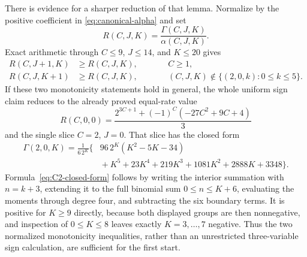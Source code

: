 \documentclass[11pt]{article}
\theoremstyle{remark}
\begin{document}
There is evidence for a sharper reduction of that lemma.  Normalize by the
positive coefficient in \eqref{eq:canonical-alpha} and set
\[
 R(C,J,K)=\frac{\Gamma(C,J,K)}{\alpha(C,J,K)}.
\]
Exact arithmetic through $C\leq9$, $J\leq14$, and $K\leq20$ gives
\begin{align*}
 R(C,J+1,K)&\geq R(C,J,K),\qquad &&C\geq1,\\
 R(C,J,K+1)&\geq R(C,J,K),
 &&(C,J,K)\notin\{(2,0,k):0\leq k\leq5\}.
\end{align*}
If these two monotonicity statements hold in general, the whole uniform sign
claim reduces to the already proved equal-rate value
\[
 R(C,0,0)=
 \frac{2^{3C+1}+(-1)^C(-27C^2+9C+4)}{3}
\]
and the single slice $C=2$, $J=0$.  That slice has the closed form
\begin{equation}\label{eq:C2-closed-form}
 \begin{aligned}
 \Gamma(2,0,K)=\frac{1}{6\,2^K}\bigl\{
 &96\,2^K(K^2-5K-34)\\
 &{}+K^5+23K^4+219K^3+1081K^2+2888K+3348
 \bigr\}.
 \end{aligned}
\end{equation}
Formula~\eqref{eq:C2-closed-form} follows by writing the interior summation
with $n=k+3$, extending it to the full binomial sum $0\leq n\leq K+6$,
evaluating the moments through degree four, and subtracting the six boundary
terms.
It is positive for $K\geq9$ directly, because both displayed groups are then
nonnegative, and inspection of $0\leq K\leq8$ leaves exactly
$K=3,\ldots,7$ negative.  Thus the two normalized monotonicity inequalities,
rather than an unrestricted three-variable sign calculation, are sufficient
for the first start.
\end{document}

